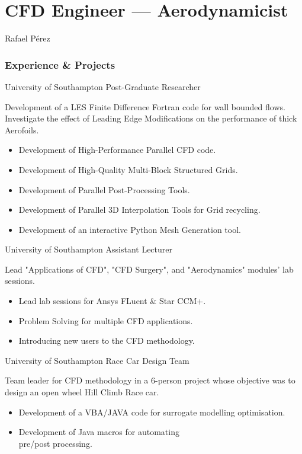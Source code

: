 \documentclass[fontsize=10pt]{tccv}
\begin{document}
\part{CFD Engineer --- Aerodynamicist}{Rafael P\'erez}

\section{Experience \& Projects}

\begin{eventlist}

     {University of Southampton}
     {Post-Graduate Researcher}

Development of a LES Finite Difference Fortran code for wall bounded flows. Investigate the effect of Leading Edge Modifications on
the performance of thick Aerofoils.
\begin{itemize}
	\itemsep -1pt
	\item Development of High-Performance Parallel CFD code.
	\item Development of High-Quality Multi-Block Structured Grids.
	\item Development of Parallel Post-Processing Tools.
	\item Development of Parallel 3D Interpolation Tools for 
	Grid recycling.
	\item Development of an interactive Python Mesh Generation tool.
\end{itemize}

	{University of Southampton}
	{Assistant Lecturer}

Lead "Applications of CFD", "CFD Surgery", and "Aerodynamics" modules' lab sessions.
	\begin{itemize}
	\itemsep -1pt
		\item Lead lab sessions for Ansys FLuent \& Star CCM+.
		\item Problem Solving for multiple CFD applications.
		\item Introducing new users to the CFD methodology.
	\end{itemize}

     {University of Southampton}
     {Race Car Design Team}

     Team leader for CFD methodology in a 6-person project whose objective was to design an open wheel Hill Climb Race car.
     \begin{itemize}
	\itemsep -1pt
     	\item Development of a VBA/JAVA code for surrogate modelling optimisation.
     	\item Development of Java macros for automating\\ pre/post processing.
     \end{itemize}


\end{eventlist}
\end{document}
